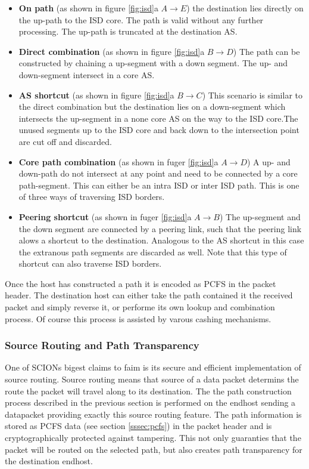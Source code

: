 \documentclass[../eva1_scion.tex]{subfiles}
\begin{document}
    \begin{itemize}
        \item \textbf{On path} (as shown in figure \ref{fig:isd}a $A \rightarrow E$) the destination lies directly on the up-path to the ISD core. The path is valid without any further processing. The up-path is truncated at the destination AS.
        \item \textbf{Direct combination} (as shown in figure \ref{fig:isd}a $B \rightarrow D$) The path can be constructed by chaining a up-segment with a down segment. The up- and down-segment intersect in a core AS.
        \item \textbf{AS shortcut} (as shown in figure \ref{fig:isd}a $B \rightarrow C$) This scenario is similar to the direct combination but the destination lies on a down-segment which intersects the up-segment in a none core AS on the way to the ISD core.The unused segments up to the ISD core and back down to the intersection point are cut off and discarded.
        \item \textbf{Core path combination} (as shown in fuger \ref{fig:isd}a $A \rightarrow D$) A up- and down-path do not intersect at any point and need to be connected by a core path-segment. This can either be an intra ISD or inter ISD path. This is one of three ways of traversing ISD borders.
        \item \textbf{Peering shortcut} (as shown in fuger \ref{fig:isd}a $A \rightarrow B$) The up-segment and the down segment are connected by a peering link, such that the peering link alows a shortcut to the destination. Analogous to the AS shortcut in this case the extranous path segments are discarded as well. Note that this type of shortcut can also traverse ISD borders.
    \end{itemize}

    Once the host has constructed a path it is encoded as PCFS in the packet header. The destination host can either take the path contained it the received packet and simply reverse it, or performe its own lookup and combination process. Of course this process is assisted by varous cashing mechanisms.

    \subsubsection{Source Routing and Path Transparency} \label{sssec:source_routing}
    One of SCIONs bigest claims to faim is its secure and efficient implementation of source routing. Source routing means that source of a data packet determins the route the packet will travel along to its destination. The the path construction process described in the previous section is performed on the endhost sending a datapacket providing exactly this source routing feature. The path information is stored as PCFS data (see section \ref{sssec:pcfs}) in the packet header and is cryptographically protected against tampering. This not only guaranties that the packet will be routed on the selected path, but also creates path transparency for the destination endhost. 
\end{document}
